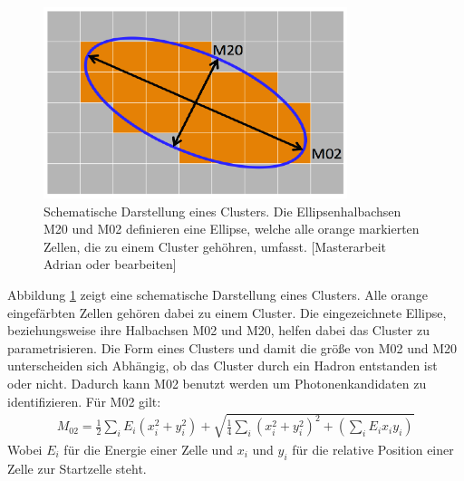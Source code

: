 \begin{figure}[thp]
\centering
\includegraphics[width=.35\linewidth]{m02&m20.png}
\caption{Schematische Darstellung eines Clusters. Die Ellipsenhalbachsen M20 und M02 definieren eine Ellipse, welche alle orange markierten Zellen, die zu einem Cluster geh\"ohren, umfasst.
[Masterarbeit Adrian oder bearbeiten]}
\label{fig:M20}
\end{figure}

Abbildung \ref{fig:M20} zeigt eine schematische Darstellung eines Clusters.
Alle orange eingef\"arbten Zellen geh\"oren dabei zu einem Cluster.
Die eingezeichnete Ellipse, beziehungsweise ihre Halbachsen M02 und M20, helfen dabei das Cluster zu parametrisieren.
Die Form eines Clusters und damit die gr\"o{\ss}e von M02 und M20 unterscheiden sich Abh\"angig, ob das Cluster durch ein Hadron entstanden ist oder nicht.
Dadurch kann M02 benutzt werden um Photonenkandidaten zu identifizieren.
F\"ur M02 gilt:
\begin{align}
M_{02} = \frac{1}{2}\sum_{i}E_{i}(x_{i}^{2}+y_{i}^{2})+\sqrt{\frac{1}{4}\sum_{i}\left(x_{i}^{2}+y_{i}^{2}\right)^{2}+\left(\sum_{i}E_{i}x_{i}y_{i}\right)}
\end{align}
Wobei $E_{i}$ f\"ur die Energie einer Zelle und $x_{i}$ und $y_{i}$ f\"ur die relative Position einer Zelle zur Startzelle steht.